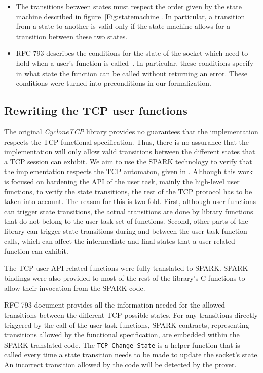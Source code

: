 \documentclass[conference]{IEEEtran}
\begin{document}
\begin{itemize}
\item The transitions between states must respect the order given by the
state machine described in figure~\ref{Fig:statemachine}. In particular, a transition from a state to another is valid only if the state machine allows for a transition between these two states.
\item RFC 793 describes the conditions for the state of the socket which need to hold when a user's function is called~\cite[p. 52]{rfc793}. In particular, these conditions specify in what state the function can be called without returning an error. These conditions were turned into preconditions in our formalization.
\end{itemize}

\subsection{Rewriting the TCP user functions}

The original \emph{CycloneTCP} library provides no guarantees that the implementation respects the TCP functional specification. Thus, there is no assurance that the implementation will only allow valid transitions between the different states that a TCP session can exhibit. We aim to use the SPARK technology to verify that the implementation respects the TCP automaton, given in . Although this work is focused on hardening the API of the user task, mainly the high-level user functions, to verify the state transitions, the rest of the TCP protocol has to be taken into account. The reason for this is two-fold. First, although user-functions can trigger state transitions, the actual transitions are done by library functions that do not belong to the user-task set of functions. Second, other parts of the library can trigger state transitions during and between the user-task function calls, which can affect the intermediate and final states that a user-related function can exhibit.

The TCP user API-related functions were fully translated to SPARK. SPARK bindings were also provided to most of the rest of the library's C functions to allow their invocation from the SPARK code.

RFC 793 document provides all the information needed for the allowed transitions between the different TCP possible states. For any transitions directly triggered by the call of the user-task functions, SPARK contracts, representing transitions allowed by the functional specification, are embedded within the SPARK translated code. The \texttt{TCP\_Change\_State} is a helper function that is called every time a state transition needs to be made to update the socket's state. An incorrect transition allowed by the code will be detected by the prover.
\end{document}
